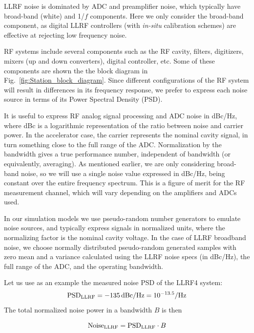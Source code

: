 \documentclass[a4paper,12pt]{article}
\begin{document}
LLRF noise is dominated by ADC and preamplifier noise, which typically have broad-band (white) and 1/$f$ components. Here we only consider the broad-band component, as digital LLRF controllers (with {\it in-situ} calibration schemes) are effective at rejecting low frequency noise.

RF systems include several components such as the RF cavity, filters, digitizers, mixers (up and down converters), digital controller, etc. Some of these components are shown the the block diagram in Fig.~\ref{fig:Station_block_diagram}. Since different configurations of the RF system will result in differences in its frequency response, we prefer to express each noise source in terms of its Power Spectral Density (PSD).

It is useful to express RF analog signal processing and ADC noise in dBc/Hz, where dBc is a logarithmic representation of the ratio between noise and carrier power. In the accelerator case, the carrier represents the nominal cavity signal, in turn something close to the full range of the \hbox{ADC}.  Normalization by the bandwidth gives a true performance number, independent of bandwidth (or equivalently, averaging). As mentioned earlier, we are only considering broad-band noise, so we will use a single noise value expressed in dBc/Hz, being constant over the entire frequency spectrum. This is a figure of merit for the RF measurement channel, which will vary depending on the amplifiers and ADCs used.

In our simulation models we use pseudo-random number generators to emulate noise sources, and typically express signals in normalized units, where the normalizing factor is the nominal cavity voltage. In the case of LLRF broadband noise, we choose normally distributed pseudo-random generated samples with zero mean and a variance calculated using the LLRF noise specs (in dBc/Hz), the full range of the ADC, and the operating bandwidth.

Let us use as an example the measured noise PSD of the LLRF4 system:
\begin{equation}
  \centering {\rm PSD}_{\rm LLRF} = -135\thinspace{\rm dBc/Hz} = 10^{-13.5} {\rm /Hz}
\end{equation}
The total normalized noise power in a bandwidth $B$ is then

\begin{equation}
  \centering {\rm Noise}_{\rm LLRF} ={\rm PSD}_{\rm LLRF}\cdot B
  \label{eq:PSD_to_noise}
\end{equation}
\end{document}
